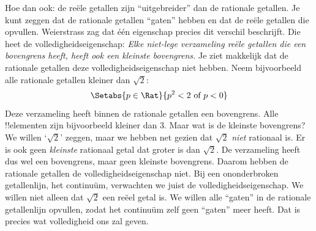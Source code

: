 \documentclass[openany]{memoir}
\begin{document}
Hoe dan ook: de reële getallen zijn ``uitgebreider'' dan de rationale
getallen. Je kunt zeggen dat de rationale getallen ``gaten'' hebben en
dat de reële getallen die opvullen. Weierstrass zag dat één eigenschap
precies dit verschil beschrijft. Die heet de volledigheidseigenschap:
\emph{Elke niet-lege verzameling reële getallen die een bovengrens
heeft, heeft ook een kleinste bovengrens.}
Je ziet makkelijk dat de rationale getallen deze
volledigheidseigenschap niet hebben. Neem bijvoorbeeld alle rationale
getallen kleiner dan $\sqrt{2}$:
\[
	\Setabs{p \in \Rat}{p^2 < 2 \text{ of }p < 0}
\]
Deze verzameling heeft binnen de rationale getallen een bovengrens.
Alle !!{element}en zijn bijvoorbeeld kleiner dan $3$. Maar wat is de
kleinste bovengrens? We willen `$\sqrt{2}$' zeggen, maar we hebben net
gezien dat $\sqrt{2}$ \emph{niet} rationaal is. Er is ook geen
\emph{kleinste} rationaal getal dat groter is dan $\sqrt{2}$. De
verzameling heeft dus wel een bovengrens, maar geen kleinste
bovengrens. Daarom hebben de rationale getallen de
volledigheidseigenschap niet.
Bij een ononderbroken getallenlijn, het continuüm, verwachten we juist
de volledigheidseigenschap. We willen niet alleen dat $\sqrt{2}$ een
reëel getal is. We willen alle ``gaten'' in de rationale getallenlijn
opvullen, zodat het continuüm zelf geen ``gaten'' meer heeft. Dat is
precies wat volledigheid ons zal geven.
\endgroup

\begingroup
\def\olfilename{OLP-0045}
\def\olfilepath{content/sets-functions-relations/arithmetization/}
\hypertarget{unit-OLP-0045}{}
%
\end{document}
